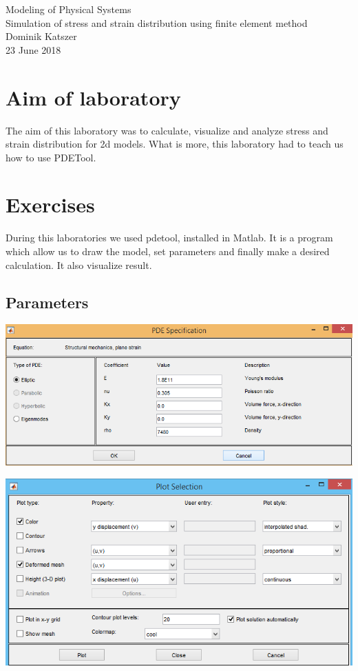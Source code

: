\documentclass[a4paper,12pt]{article}
\begin{document}
\begin{titlepage}
\center
\vspace*{\fill}
\Huge{Modeling of Physical Systems}\\
\Large{Simulation of stress and strain distribution
using finite element method}\\
\vspace*{1.5cm}
Dominik Katszer\\
\large{23 June 2018}
\vspace*{1.5cm}
\vspace*{\fill}
\end{titlepage}
\section{Aim of laboratory}
The aim of this laboratory was to calculate, visualize and analyze stress and strain distribution for 2d models. What is more, this laboratory had to teach us how to use PDETool.

\section{Exercises}
During this laboratories we used pdetool, installed in Matlab. It is a program which allow us to draw the model, set
parameters and finally make a desired calculation. It also visualize result.
\subsection{Parameters}
\centerline{\includegraphics[scale=0.7]{stainless_Stell_properties}}
\centerline{\includegraphics[scale=0.7]{plotParameters}}
\end{document}
